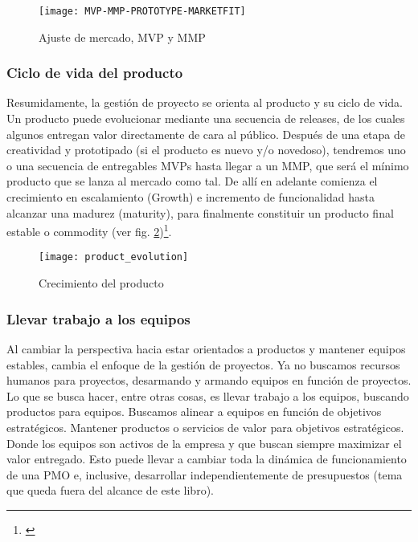 \begin{figure}[h]
  \centering
  \texttt{[image: MVP-MMP-PROTOTYPE-MARKETFIT]}
  \caption{Ajuste de mercado, MVP y MMP}
  \centering
  \label{fig:MVP-MMP-PROTOTYPE-MARKETFIT} %
\end{figure}
\FloatBarrier %


\subsubsection{Ciclo de vida del producto}

Resumidamente, la gestión de proyecto se orienta al producto y su ciclo de vida. Un producto puede evolucionar mediante una secuencia de releases, de los cuales algunos entregan valor directamente de cara al público. Después de una etapa de creatividad y prototipado (si el producto es nuevo y/o novedoso), tendremos uno o una secuencia de entregables MVPs hasta llegar a un MMP, que será el mínimo producto que se lanza al mercado como tal. De allí en adelante comienza el crecimiento en escalamiento (Growth) e incremento de funcionalidad hasta alcanzar una madurez (maturity), para finalmente constituir un producto final estable o commodity (ver fig. \ref{fig:product_evolution})\footnote{\cite{Greg-Gehrich-2012}}.

\begin{figure}[h]
  \centering
  \texttt{[image: product\_evolution]}
  \caption{Crecimiento del producto}
  \centering
  \label{fig:product_evolution} %
\end{figure}
\FloatBarrier %

\subsubsection{Llevar trabajo a los equipos}

Al cambiar la perspectiva hacia estar orientados a productos y mantener equipos estables, cambia el enfoque de la gestión de proyectos. Ya no buscamos recursos humanos para proyectos, desarmando y armando equipos en función de proyectos. Lo que se busca hacer, entre otras cosas, es llevar trabajo a los equipos, buscando productos para equipos. Buscamos alinear a equipos en función de objetivos estratégicos. Mantener productos o servicios de valor para objetivos estratégicos. Donde los equipos son activos de la empresa y que buscan siempre maximizar el valor entregado. Esto puede llevar a cambiar toda la dinámica de funcionamiento de una PMO e, inclusive, desarrollar independientemente de presupuestos (tema que queda fuera del alcance de este libro).

